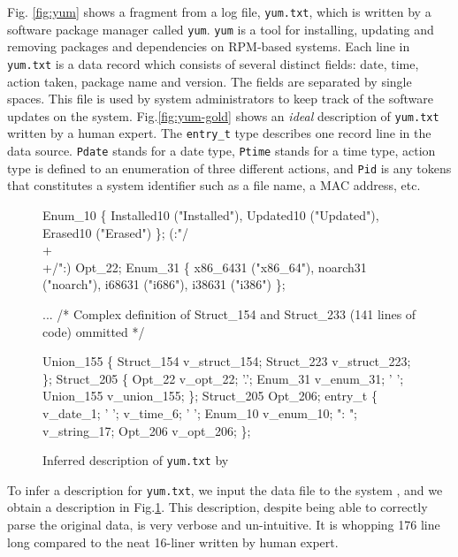 Fig. \ref{fig:yum} shows a fragment from a log file, {\tt yum.txt},
which is written by a software package manager called {\tt yum}. {\tt yum} 
is a tool for installing, updating and removing packages and dependencies
on RPM-based systems. Each line in {\tt yum.txt} is a data record
which consists of several distinct fields: date, time, action taken,
package name and version. The fields are separated by single spaces.
This file is used by system administrators to keep track of the
software updates on the system.
Fig.\ref{fig:yum-gold} shows an {\em ideal} \pads{} description of
{\tt yum.txt} written by a human expert.
The {\tt entry\_t} type describes one record line in the data source.
{\tt Pdate} stands for a date type, {\tt Ptime} stands for a time type,
action type is defined to an enumeration of three different actions,
and {\tt Pid} is any tokens that constitutes a system identifier such as a file
name, a MAC address, etc.

\begin{figure}[t]
\begin{centercode}
 Enum_10 \{
  Installed10 ("Installed"),
  Updated10 ("Updated"),
  Erased10 ("Erased")
\};
(:"/\\+\\+/":) Opt_22;
 Enum_31 \{
  x86_6431 ("x86_64"),
  noarch31 ("noarch"),
  i68631 ("i686"),
  i38631 ("i386")
\};

... /* Complex definition of Struct_154 and Struct_233 
       (141 lines of code) ommitted */

 Union_155 \{
  Struct_154  v_struct_154;
  Struct_223  v_struct_223;
\};
 Struct_205 \{
  Opt_22  v_opt_22;
  '.';
  Enum_31  v_enum_31;
  ' ';
  Union_155  v_union_155;
\};
 Struct_205 Opt_206;
 entry_t \{
    v_date_1;
  ' ';
    v_time_6;
  ' ';
  Enum_10  v_enum_10;
  ": ";
   v_string_17;
  Opt_206  v_opt_206;
\};
\end{centercode}
\caption{Inferred \pads{} description of {\tt yum.txt} by \learnpads}\label{fig:yum-bad}
\end{figure}

 
To infer a \pads{} description for {\tt yum.txt},
we input the data file to the \learnpads{} system 
\cite{fisher+:dirttoshovels,fisher+:sigmod08}, and we obtain
a description in Fig.\ref{fig:yum-bad}.
This description, despite being able to correctly parse the original data,
is very verbose and un-intuitive. It is whopping 176 line long compared 
to the neat 16-liner written by human expert.

